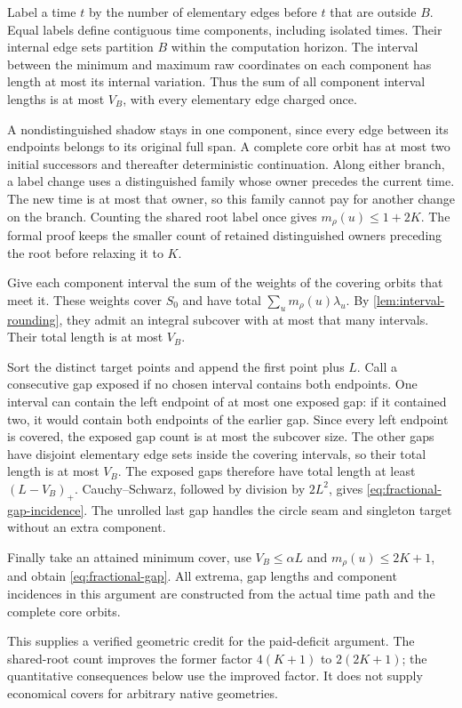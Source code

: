 \begin{outline}
Label a time $t$ by the number of elementary edges before $t$ that are
outside $B$. Equal labels define contiguous time components, including
isolated times. Their internal edge sets partition $B$ within the
computation horizon. The interval
between the minimum and maximum raw coordinates on each component has
length at most its internal variation. Thus the sum of all component
interval lengths is at most $V_B$, with every elementary edge charged once.

A nondistinguished shadow stays in one component, since every edge
between its endpoints belongs to its original full span. A complete
core orbit has at most two initial successors and thereafter deterministic
continuation. Along either branch, a label change uses a distinguished
family whose owner precedes the current time. The new time is at most
that owner, so this family cannot pay for another change on the branch.
Counting the shared root label once gives $m_\rho(u)\le1+2K$.
The formal proof keeps the smaller count of retained distinguished
owners preceding the root before relaxing it to $K$.

Give each component interval the sum of the weights of the covering
orbits that meet it. These weights cover $S_0$ and have total
$\sum_um_\rho(u)\lambda_u$. By \cref{lem:interval-rounding}, they
admit an integral subcover with at most that many intervals. Their
total length is at most $V_B$.

Sort the distinct target points and append the first point plus $L$.
Call a consecutive gap exposed if no chosen interval contains both
endpoints. One interval can contain the left endpoint of at most one
exposed gap: if it contained two, it would contain both endpoints of
the earlier gap. Since every left endpoint is covered, the exposed
gap count is at most the subcover size. The other gaps have disjoint
elementary edge sets inside the covering intervals, so their total
length is at most $V_B$. The exposed gaps therefore have total length
at least $(L-V_B)_+$. Cauchy--Schwarz, followed by division by $2L^2$,
gives \cref{eq:fractional-gap-incidence}. The unrolled last gap handles
the circle seam and singleton target without an extra component.

Finally take an attained minimum cover, use $V_B\le\alpha L$ and
$m_\rho(u)\le2K+1$, and obtain \cref{eq:fractional-gap}. All extrema,
gap lengths and component incidences in this argument are constructed
from the actual time path and the complete core orbits.
\end{outline}
This supplies a verified geometric credit for the paid-deficit argument.
The shared-root count improves the former factor $4(K+1)$ to $2(2K+1)$;
the quantitative consequences below use the improved factor. It does not
supply economical covers for arbitrary native geometries.

